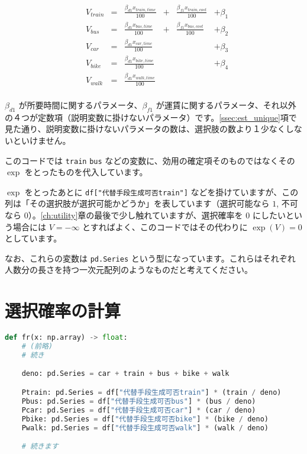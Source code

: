 \begin{equation}
    \label{eq:utility_sample}
    \begin{aligned}
         & V_{train} & = & \frac{\beta_{d1} x_{train, time}}{100} & + & \frac{\beta_{f1} x_{train, cost}}{100} & + \beta_1 \\
         & V_{bus}   & = & \frac{\beta_{d1} x_{bus, time}}{100}   & + & \frac{\beta_{f1} x_{bus, cost}}{100}   & + \beta_2 \\
         & V_{car}   & = & \frac{\beta_{d1} x_{car, time}}{100}   &   &                                        & + \beta_3 \\
         & V_{bike}  & = & \frac{\beta_{d1} x_{bike, time}}{100}  &   &                                        & + \beta_4 \\
         & V_{walk}  & = & \frac{\beta_{d1} x_{walk, time}}{100}                                                           \\
    \end{aligned}
\end{equation}



$\beta_{d1}$ が所要時間に関するパラメータ、$\beta_{f1}$ が運賃に関するパラメータ、それ以外の４つが定数項（説明変数に掛けないパラメータ）です。\ref{ssec:est_unique}項で見た通り、説明変数に掛けないパラメータの数は、選択肢の数より１少なくしないといけません。

このコードでは \lstinline{train} \lstinline{bus} などの変数に、効用の確定項そのものではなくその $\exp$ をとったものを代入しています。

$\exp$ をとったあとに \lstinline{df["代替手段生成可否train"]} などを掛けていますが、この列は「その選択肢が選択可能かどうか」を表しています（選択可能なら $1$, 不可なら $0$）。\ref{ch:utility}章の最後で少し触れていますが、選択確率を $0$ にしたいという場合には $V=-\infty$ とすればよく、このコードではその代わりに $\exp(V)=0$ としています。

なお、これらの変数は \lstinline{pd.Series} という型になっています。これらはそれぞれ人数分の長さを持つ一次元配列のようなものだと考えてください。

\section{選択確率の計算}

\begin{lstlisting}[language=Python]
def fr(x: np.array) -> float:
    # (前略)
    # 続き

    deno: pd.Series = car + train + bus + bike + walk

    Ptrain: pd.Series = df["代替手段生成可否train"] * (train / deno)
    Pbus: pd.Series = df["代替手段生成可否bus"] * (bus / deno)
    Pcar: pd.Series = df["代替手段生成可否car"] * (car / deno)
    Pbike: pd.Series = df["代替手段生成可否bike"] * (bike / deno)
    Pwalk: pd.Series = df["代替手段生成可否walk"] * (walk / deno)

    # 続きます
\end{lstlisting}

